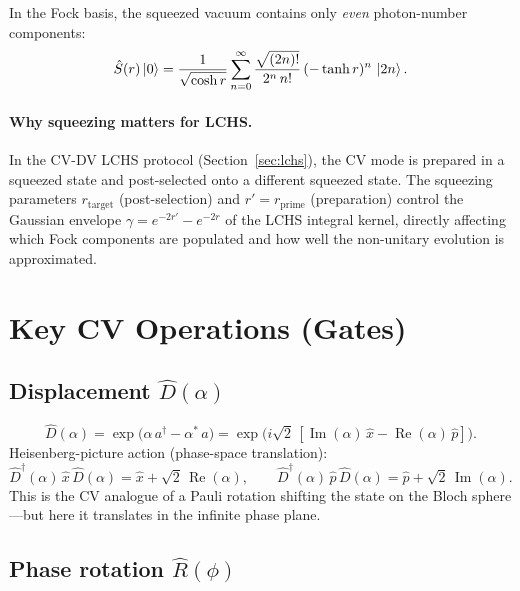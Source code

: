 \documentclass[11pt]{article}
\newcommand{\xh}{\hat{x}}
\newcommand{\ph}{\hat{p}}
\newcommand{\ad}{a^{\dagger}}
\newcommand{\Dop}{\hat{D}}
\newcommand{\Sop}{\hat{S}}
\newcommand{\Rop}{\hat{R}}
\begin{document}
In the Fock basis, the squeezed vacuum contains only \emph{even}
photon-number components:
\begin{equation}
\Sop(r)\ket{0} = \frac{1}{\sqrt{\cosh r}}
\sum_{n=0}^{\infty} \frac{\sqrt{(2n)!}}{2^n\, n!}\,
(-\tanh r)^n\, \ket{2n}.
\end{equation}

\paragraph{Why squeezing matters for LCHS.}
In the CV-DV LCHS protocol (Section~\ref{sec:lchs}), the CV mode is
prepared in a squeezed state and post-selected onto a different squeezed
state.  The squeezing parameters $r_{\mathrm{target}}$ (post-selection) and
$r' = r_{\mathrm{prime}}$ (preparation) control the Gaussian envelope
$\gamma = e^{-2r'} - e^{-2r}$ of the LCHS integral kernel, directly
affecting which Fock components are populated and how well the
non-unitary evolution is approximated.

\section{Key CV Operations (Gates)}
\label{sec:gates}

\subsection{Displacement $\Dop(\alpha)$}

\begin{equation}\label{eq:displacement}
\Dop(\alpha) = \exp\!\big(\alpha\,\ad - \alpha^*\, a\big)
  = \exp\!\big(i\sqrt{2}\,[\operatorname{Im}(\alpha)\,\xh
    - \operatorname{Re}(\alpha)\,\ph]\big).
\end{equation}
Heisenberg-picture action (phase-space translation):
\begin{equation}
\Dop^\dagger(\alpha)\,\xh\,\Dop(\alpha) = \xh + \sqrt{2}\,\operatorname{Re}(\alpha),
\qquad
\Dop^\dagger(\alpha)\,\ph\,\Dop(\alpha) = \ph + \sqrt{2}\,\operatorname{Im}(\alpha).
\end{equation}
This is the CV analogue of a Pauli rotation shifting the state on the
Bloch sphere---but here it translates in the infinite phase plane.

\subsection{Phase rotation $\Rop(\phi)$}
\end{document}
